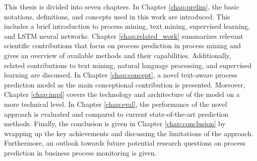 This thesis is divided into seven chapters.
In Chapter \ref{chap:prelim}, the basic notations, definitions, and concepts used in this work are introduced.
This includes a brief introduction to process mining, text mining, supervised learning, and LSTM neural networks.
Chapter \ref{chap:related_work} summarizes relevant scientific contributions that focus on process prediction in process mining and gives an overview of available methods and their capabilities.
Additionally, related contributions to text mining, natural language processing, and supervised learning are discussed.
In Chapter \ref{chap:concept}, a novel text-aware process prediction model as the main conceptional contribution is presented.
Moreover, Chapter \ref{chap:impl} covers the technology and architecture of the model on a more technical level.
In Chapter \ref{chap:eval}, the performance of the novel approach is evaluated and compared to current state-of-the-art prediction methods.
Finally, the conclusion is given in Chapter \ref{chap:conclusion} by wrapping up the key achievements and discussing the limitations of the approach.
Furthermore, an outlook towards future potential research questions on process prediction in business process monitoring is given.